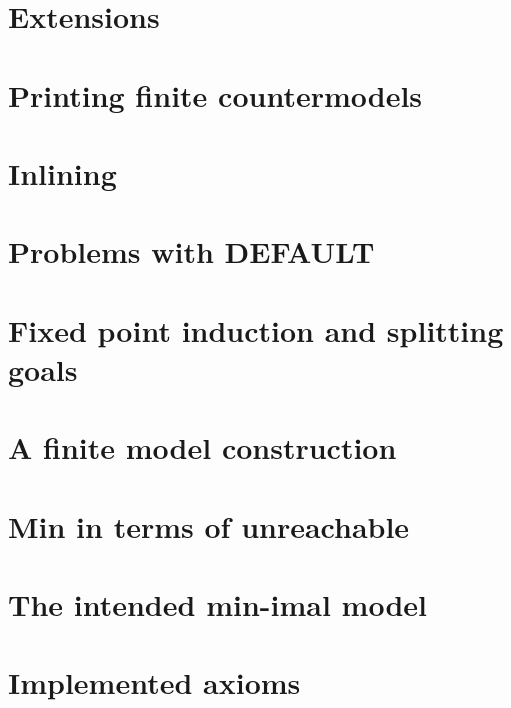 \documentclass[preprint,nocopyrightspace]{sigplanconf}
\begin{document}
\section{Extensions}
  

\section{Printing finite countermodels}
  

\section{Inlining}
  

\section{Problems with DEFAULT}
  

\section{Fixed point induction and splitting goals}
  

\section{A finite model construction}\label{sect:finite-model-proof}


\section{Min in terms of unreachable}


\section{The intended min-imal model}


\section{Implemented axioms}

\end{document}
